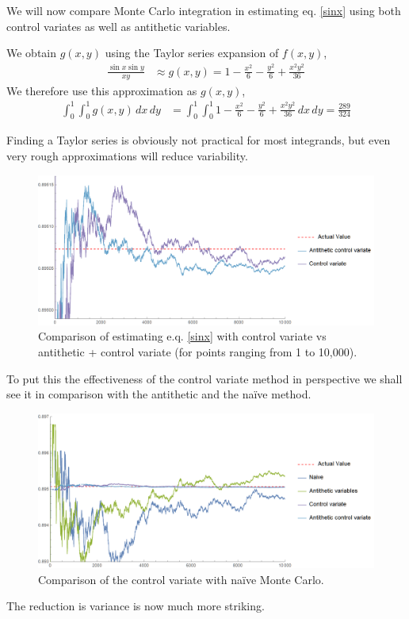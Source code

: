 \documentclass[12pt]{article}
\numberwithin{equation}{section}
\begin{document}
\par We will now compare Monte Carlo integration in estimating eq. \ref{sinx} using both control variates as well as antithetic variables.
\par We obtain $g(x,y)$ using the Taylor series expansion of $f(x,y)$, 
\begin{align*}
    \frac{\sin x \sin y}{xy}&\approx g(x,y) = 1-\frac{x^2}{6}-\frac{y^2}{6}+\frac{x^2 y^2}{36}
\end{align*}
We therefore use this approximation as $g(x,y)$,
\begin{align}
    \int_0^1 \int_0^1 g(x, y)\, dx\, dy&=\int_0^1 \int_0^1 1-\frac{x^2}{6}-\frac{y^2}{6}+\frac{x^2 y^2}{36}\, dx\, dy= \frac{289}{324}
\end{align}
\par Finding a Taylor series is obviously not practical for most integrands, but even very rough approximations will reduce variability.
\begin{figure}[!htb]
    \centering
    \includegraphics[width=12cm]{Images/controlvariate.png}
    \caption{Comparison of estimating e.q. \ref{sinx} with control variate vs antithetic + control variate (for points ranging from 1 to 10,000).}
    \label{fig:controlvariate}
\end{figure}
\FloatBarrier
\par To put this the effectiveness of the control variate method in perspective we shall see it in comparison with the antithetic and the naïve method.

\begin{figure}[!htb]
    \centering
    \includegraphics[width=12cm]{Images/controlvsnaiveanti.png}
    \caption{Comparison of the control variate with naïve Monte Carlo.}
    \label{fig:controlvsnaivevariate}
\end{figure}
\par The reduction is variance is now much more striking.
\end{document}

